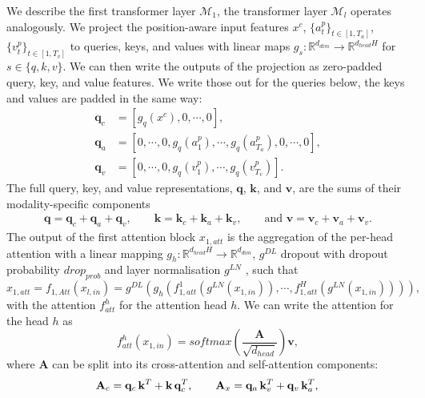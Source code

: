 \documentclass[runningheads]{llncs}
\begin{document}
We describe the first transformer layer $\mathcal{M}_1$, the transformer layer $\mathcal{M}_l$ operates analogously. 
We project the position-aware input features $x^c$, $\{a_t^p\}_{t \in [1,T_a]}$, $\{v_t^p\}_{t \in [1,T_v]}$ to queries, keys, and values with linear maps $g_s: \mathbb{R}^{d_{dim}} \xrightarrow{} \mathbb{R}^{d_{head} H}$ for $s \in \{q,k,v\}$. We can then write the outputs of the projection as zero-padded query, key, and value features. We write those out for the queries below, the keys and values are padded in the same way:
\begin{align}
    \mathbf{q}_c &= [g_q(x^c), 0, \cdots, 0],\\
    \mathbf{q}_a &= [0,\cdots,0,g_q(a^p_1),\cdots,g_q(a^p_{T_a}), 0, \cdots, 0], \\
     \mathbf{q}_v &= [0,\cdots,0,g_q(v^p_1),\cdots,g_q(v^p_{T_v})].
\end{align}
The full query, key, and value representations, $\mathbf{q}$, $\mathbf{k}$, and $\mathbf{v}$, are the sums of their modality-specific components
\begin{align}\label{eq:modality_components}
    \mathbf{q} = \mathbf{q}_c + \mathbf{q}_a + \mathbf{q}_v, \qquad 
    \mathbf{k} = \mathbf{k}_c + \mathbf{k}_a + \mathbf{k}_v, \qquad \text{and   } 
    \mathbf{v} = \mathbf{v}_c + \mathbf{v}_a + \mathbf{v}_v.
\end{align} 
The output of the first attention block $x_{1,att}$ is the aggregation of the per-head attention with a linear mapping $g_h: \mathbb{R}^{d_{head} H} \rightarrow \mathbb{R}^{d_{dim}}$, $g^{DL}$ dropout with dropout probability $drop_{prob}$ and layer normalisation $g^{LN}$ \cite{ba2016layer}, such that
\begin{equation}
    x_{1,att} = f_{1,Att}(x_{l,in}) = g^{DL}(g_h(f_{1,att}^1(g^{LN}(x_{1,in})),\cdots,f_{1,att}^H(g^{LN}(x_{1,in})))),
\end{equation}
with the attention $f^h_{att}$ for the attention head $h$.
We can write the attention for the head $h$ as 
\begin{equation}
    f^h_{att}(x_{1,in}) = softmax \left( \frac{\mathbf{A}}{\sqrt{d_{head}}} \right) \mathbf{v},
\end{equation}
where $\mathbf{A}$ can be split into its cross-attention and self-attention components:
\begin{equation}\label{eq:attention}
\mathbf{A}_c 
= \mathbf{q}_c \, \mathbf{k}^T + \mathbf{k} \, \mathbf{q}_c^T, \qquad 
\mathbf{A}_x =
\mathbf{q}_a \, \mathbf{k}_v^T + \mathbf{q}_v \, \mathbf{k}_a^T, \\
\end{equation}
\end{document}
